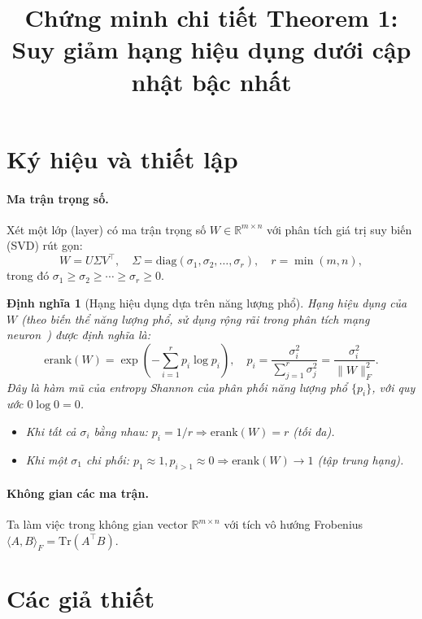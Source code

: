 \documentclass[11pt,a4paper]{article}
\title{Chứng minh chi tiết Theorem 1: \\ Suy giảm hạng hiệu dụng dưới cập nhật bậc nhất}
\author{}
\date{}
\newtheorem{definition}{Định nghĩa}
\newcommand{\erank}{\mathrm{erank}}
\newcommand{\RR}{\mathbb{R}}
\newcommand{\Tr}{\mathrm{Tr}}
\begin{document}
\maketitle

\section{Ký hiệu và thiết lập}

\paragraph{Ma trận trọng số.}
Xét một lớp (layer) có ma trận trọng số $W \in \RR^{m \times n}$ với phân tích giá trị suy biến (SVD) rút gọn:
\[
W = U \Sigma V^\top, \quad \Sigma = \mathrm{diag}(\sigma_1, \sigma_2, \ldots, \sigma_r), \quad r = \min(m, n),
\]
trong đó $\sigma_1 \geq \sigma_2 \geq \cdots \geq \sigma_r \geq 0$.

\begin{definition}[Hạng hiệu dụng dựa trên năng lượng phổ]
\label{def:erank}
Hạng hiệu dụng của $W$ (theo biến thể năng lượng phổ, sử dụng rộng rãi trong phân tích mạng neuron~\cite{he2024spectral, lewandowski2025spectral}) được định nghĩa là:
\[
\erank(W) = \exp\!\left(-\sum_{i=1}^{r} p_i \log p_i\right), \quad p_i = \frac{\sigma_i^2}{\sum_{j=1}^r \sigma_j^2} = \frac{\sigma_i^2}{\|W\|_F^2}.
\]
Đây là hàm mũ của entropy Shannon của phân phối năng lượng phổ $\{p_i\}$, với quy ước $0 \log 0 = 0$.
\begin{itemize}[nosep]
    \item Khi tất cả $\sigma_i$ bằng nhau: $p_i = 1/r \Rightarrow \erank(W) = r$ (tối đa).
    \item Khi một $\sigma_1$ chi phối: $p_1 \approx 1, p_{i>1} \approx 0 \Rightarrow \erank(W) \to 1$ (tập trung hạng).
\end{itemize}
\end{definition}

\paragraph{Không gian các ma trận.}
Ta làm việc trong không gian vector $\RR^{m \times n}$ với tích vô hướng Frobenius $\langle A, B \rangle_F = \Tr(A^\top B)$.

\section{Các giả thiết}
\end{document}
